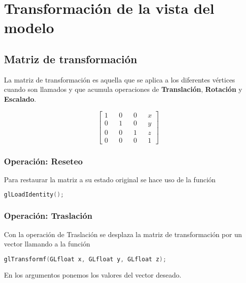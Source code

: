 \chapter{Transformación de la vista del modelo}
\section{Matriz de transformación}
La matriz de transformación es aquella que se aplica a los diferentes vértices cuando son llamados y que acumula operaciones de \textbf{Translación}, \textbf{Rotación} y \textbf{Escalado}.
 \begin{figure}[ht]
   \centering
   \[
  \begin{bmatrix}
    1 && 0 && 0 && x\\
    0 && 1 && 0 && y\\
    0 && 0 && 1 && z\\
    0 && 0 && 0 && 1
  \end{bmatrix}
  \]
 \end{figure}
 \subsection{Operación: Reseteo}
Para restaurar la matriz a su estado original se hace uso de la función
\begin{lstlisting}[language=C]
  glLoadIdentity();
\end{lstlisting}
\subsection{Operación: Traslación}
Con la operación de Traslación se desplaza la matriz de transformación por un vector llamando a la función
\begin{lstlisting}[language=C]
  glTransformf(GLfloat x, GLfloat y, GLfloat z);
\end{lstlisting}
En los argumentos ponemos los valores del vector deseado.
